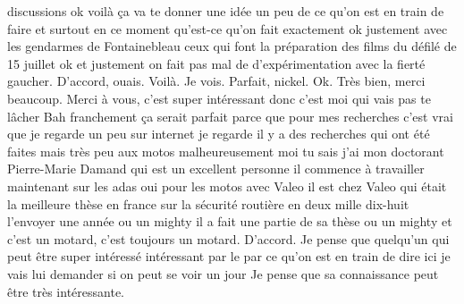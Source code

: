 discussions ok voilà ça va te donner une idée un peu de ce qu'on est en train de faire et surtout en ce moment qu'est-ce qu'on fait exactement ok justement avec les gendarmes de Fontainebleau ceux qui font la préparation des films du défilé de 15 juillet ok et justement on fait pas mal de d'expérimentation avec la fierté gaucher. D'accord, ouais. Voilà. Je vois. Parfait, nickel. Ok. Très bien, merci beaucoup. Merci à vous, c'est super intéressant donc c'est moi qui vais pas te lâcher Bah franchement ça serait parfait parce que pour mes recherches c'est vrai que je regarde un peu sur internet je regarde il y a des recherches qui ont été faites mais très peu aux motos malheureusement moi tu sais j'ai mon doctorant Pierre-Marie Damand qui est un excellent personne il commence à travailler maintenant sur les adas oui pour les motos avec Valeo il est chez Valeo qui était la meilleure thèse en france sur la sécurité routière en deux mille dix-huit l'envoyer une année ou un mighty il a fait une partie de sa thèse ou un mighty et c'est un motard, c'est toujours un motard. D'accord. Je pense que quelqu'un qui peut être super intéressé intéressant par le par ce qu'on est en train de dire ici je vais lui demander si on peut se voir un jour Je pense que sa connaissance peut être très intéressante.

